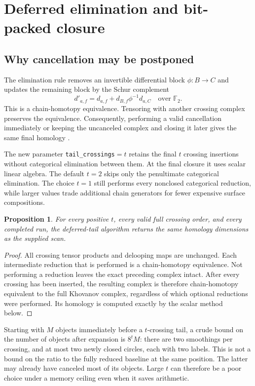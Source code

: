 \documentclass[11pt]{article}
\newtheorem{proposition}[theorem]{Proposition}
\theoremstyle{remark}\newtheorem{remark}[theorem]{Remark}
\newcommand{\F}{\mathbb F}
\begin{document}
\section{Deferred elimination and bit-packed closure}\label{sec:tail}
\subsection{Why cancellation may be postponed}
The elimination rule removes an invertible differential block
$\phi:B\to C$ and updates the remaining block by the Schur complement
\[
                   d'_{a,f}=d_{a,f}+d_{B,f}\phi^{-1}d_{a,C}
                   \quad\text{over }\F_2.
\]
This is a chain-homotopy equivalence. Tensoring with another crossing
complex preserves the equivalence. Consequently, performing a valid
cancellation immediately or keeping the uncanceled complex and closing it
later gives the same final homology \cite{BarNatan}.

The new parameter \texttt{tail\_crossings}$=t$ retains the final $t$ crossing
insertions without categorical elimination between them. At the final
closure it uses scalar linear algebra. The default $t=2$ skips only the
penultimate categorical elimination. The choice $t=1$ still performs every
nonclosed categorical reduction, while larger values trade additional
chain generators for fewer expensive surface compositions.

\begin{proposition}
For every positive $t$, every valid full crossing order, and every completed
run, the deferred-tail algorithm returns the same homology dimensions as
the supplied scan.
\end{proposition}
\begin{proof}
All crossing tensor products and delooping maps are unchanged. Each
intermediate reduction that is performed is a chain-homotopy equivalence.
Not performing a reduction leaves the exact preceding complex intact.
After every crossing has been inserted, the resulting complex is therefore
chain-homotopy equivalent to the full Khovanov complex, regardless of which
optional reductions were performed. Its homology is computed exactly by
the scalar method below.
\end{proof}

Starting with $M$ objects immediately before a $t$-crossing tail, a crude
bound on the number of objects after expansion is $8^tM$: there are two
smoothings per crossing, and at most two newly closed circles, each with
two labels. This is not a bound on the ratio to the fully reduced
baseline at the same position. The latter may already have canceled most
of its objects. Large $t$ can therefore be a poor choice under a memory
ceiling even when it saves arithmetic.
\end{document}
